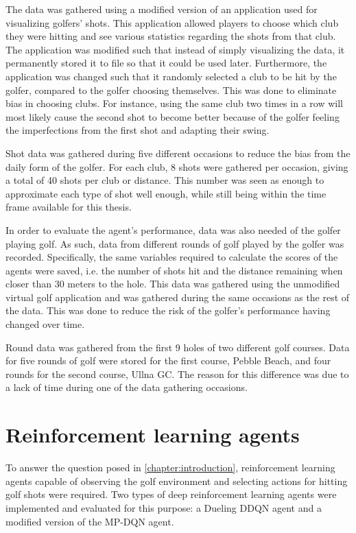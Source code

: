 \documentclass{kththesis}
\begin{document}
The data was gathered using a modified version of an application used for visualizing golfers' shots. This application allowed players to choose which club they were hitting and see various statistics regarding the shots from that club. The application was modified such that instead of simply visualizing the data, it permanently stored it to file so that it could be used later. Furthermore, the application was changed such that it randomly selected a club to be hit by the golfer, compared to the golfer choosing themselves. This was done to eliminate bias in choosing clubs. For instance, using the same club two times in a row will most likely cause the second shot to become better because of the golfer feeling the imperfections from the first shot and adapting their swing.

Shot data was gathered during five different occasions to reduce the bias from the daily form of the golfer. For each club, 8 shots were gathered per occasion, giving a total of 40 shots per club or distance. This number was seen as enough to approximate each type of shot well enough, while still being within the time frame available for this thesis. 

In order to evaluate the agent's performance, data was also needed of the golfer playing golf. As such, data from different rounds of golf played by the golfer was recorded. Specifically, the same variables required to calculate the scores of the agents were saved, i.e. the number of shots hit and the distance remaining when closer than 30 meters to the hole. This data was gathered using the unmodified virtual golf application and was gathered during the same occasions as the rest of the data. This was done to reduce the risk of the golfer's performance having changed over time. 

Round data was gathered from the first 9 holes of two different golf courses. Data for five rounds of golf were stored for the first course, Pebble Beach, and four rounds for the second course, Ullna GC. The reason for this difference was due to a lack of time during one of the data gathering occasions.

\section{Reinforcement learning agents}
To answer the question posed in \autoref{chapter:introduction}, reinforcement learning agents capable of observing the golf environment and selecting actions for hitting golf shots were required. Two types of deep reinforcement learning agents were implemented and evaluated for this purpose: a Dueling DDQN agent and a modified version of the MP-DQN agent.
\end{document}
